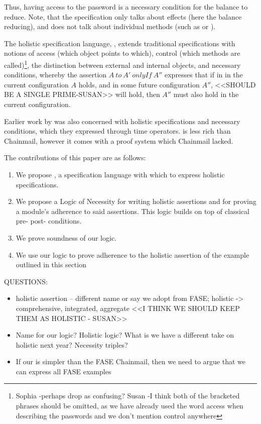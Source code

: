  
 Thus, having access to the password is a necessary condition for the balance to reduce.
 Note, that the specification only talks about effects (here the balance reducing), and does not
 talk about individual methods (such as  or ).
 

 The holistic specification language, \Chainmail, extends traditional specifications with
notions of access (which object points to which), control (which methods are called)\footnote{Sophia -perhaps drop as confusing? Susan -I think both of the bracketed phrases should be omitted, as we have already used the word access when describing the passwords and we don't mention control anywhere}, 
 the distinction between external and internal objects, and necessary conditions, 
 whereby the assertion $A~to~A'~onlyIf~A''$ expresses that if in in the current configuration
 $A$ holds, and in some future configuration $A''$, <<SHOULD BE A SINGLE PRIME-SUSAN>> will hold, then $A''$ must also hold in the 
 current configuration.  
 
 Earlier work by \citeauthor{FASE} was also concerned with 
 holistic specifications and necessary conditions, which they expressed through time operators.
 \Chainmail is less rich than Chainmail, however it comes with a proof system which Chainmail lacked.
 
  
 The contributions of this paper are as follows:
 
 \begin{enumerate}
 \item
 We propose \Chainmail, a specification language with which to
express holistic specifications. 
 \item
 We propose a Logic of Necessity for writing holistic assertions and for proving a module's adherence to said assertions.
 This logic builds on top of classical pre- post- conditions.
 \item
 We prove soundness of our logic.  
 \item
 We use our logic to prove adherence to the holistic assertion of the example
outlined  in this section
 \end{enumerate}
 
 QUESTIONS:
 \begin{itemize}
 \item
 holistic assertion -- different name or say we adopt from FASE; holistic -> comprehensive, integrated, aggregate <<I THINK WE SHOULD KEEP THEM AS HOLISTIC  - SUSAN>>
 \item
 Name for our logic?  Holistic logic? What is we have a different take on holistic next year? Necessity triples? 
\item
If our \Chainmail is simpler than the FASE Chainmail, then we need to argue that we can express all FASE examples
 \end{itemize}
  
